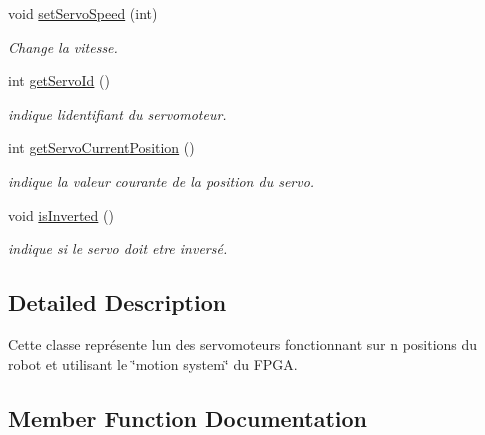 \begin{DoxyCompactItemize}
void \hyperlink{classServoMotorStd_a4aa6332476150562db280920882b65ba}{set\+Servo\+Speed} (int)
\begin{DoxyCompactList}\small\item\em Change la vitesse. \end{DoxyCompactList}\item 
\mbox{\label{classServoMotorStd_a2484ca12416ecd273cd1d0c68f9939e0}} 
int \hyperlink{classServoMotorStd_a2484ca12416ecd273cd1d0c68f9939e0}{get\+Servo\+Id} ()
\begin{DoxyCompactList}\small\item\em indique l\textquotesingle{}identifiant du servomoteur. \end{DoxyCompactList}\item 
\mbox{\label{classServoMotorStd_afbc96aff6e05c991f514c326b0fbd5fb}} 
int \hyperlink{classServoMotorStd_afbc96aff6e05c991f514c326b0fbd5fb}{get\+Servo\+Current\+Position} ()
\begin{DoxyCompactList}\small\item\em indique la valeur courante de la position du servo. \end{DoxyCompactList}\item 
\mbox{\label{classServoMotorStd_a5075ff60f754d7133bb69e157cfdc185}} 
void \hyperlink{classServoMotorStd_a5075ff60f754d7133bb69e157cfdc185}{is\+Inverted} ()
\begin{DoxyCompactList}\small\item\em indique si le servo doit etre inversé. \end{DoxyCompactList}\end{DoxyCompactItemize}


\subsection{Detailed Description}
Cette classe représente l\textquotesingle{}un des servomoteurs fonctionnant sur n positions du robot et utilisant le \char`\"{}motion system\char`\"{} du F\+P\+GA. 

\subsection{Member Function Documentation}
\mbox{\label{classServoMotorStd_a680ab8eb08df76e4da18255a55c6110d}} 
